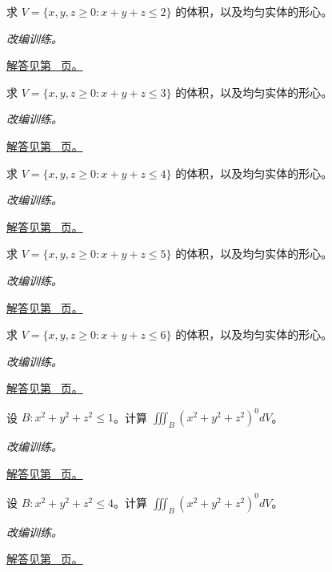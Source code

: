 \documentclass[12pt,fontset=fandol]{ctexart}
\begin{document}
\begin{example}[四面体体积与形心]\label{ex:c38q8}
求 $V=\{x,y,z\ge0:x+y+z\le 2\}$ 的体积，以及均匀实体的形心。
\par\textit{改编训练。}\par\hyperref[ans:c38q8]{解答见第~\pageref{ans:c38q8} 页。}
\end{example}
\begin{example}[四面体体积与形心]\label{ex:c38q9}
求 $V=\{x,y,z\ge0:x+y+z\le 3\}$ 的体积，以及均匀实体的形心。
\par\textit{改编训练。}\par\hyperref[ans:c38q9]{解答见第~\pageref{ans:c38q9} 页。}
\end{example}
\begin{example}[四面体体积与形心]\label{ex:c38q10}
求 $V=\{x,y,z\ge0:x+y+z\le 4\}$ 的体积，以及均匀实体的形心。
\par\textit{改编训练。}\par\hyperref[ans:c38q10]{解答见第~\pageref{ans:c38q10} 页。}
\end{example}
\begin{example}[四面体体积与形心]\label{ex:c38q11}
求 $V=\{x,y,z\ge0:x+y+z\le 5\}$ 的体积，以及均匀实体的形心。
\par\textit{改编训练。}\par\hyperref[ans:c38q11]{解答见第~\pageref{ans:c38q11} 页。}
\end{example}
\begin{example}[四面体体积与形心]\label{ex:c38q12}
求 $V=\{x,y,z\ge0:x+y+z\le 6\}$ 的体积，以及均匀实体的形心。
\par\textit{改编训练。}\par\hyperref[ans:c38q12]{解答见第~\pageref{ans:c38q12} 页。}
\end{example}
\begin{example}[球内的径向积分]\label{ex:c38q13}
设 $B:x^2+y^2+z^2\le 1$。计算 $\displaystyle\iiint_B(x^2+y^2+z^2)^{0}dV$。
\par\textit{改编训练。}\par\hyperref[ans:c38q13]{解答见第~\pageref{ans:c38q13} 页。}
\end{example}
\begin{example}[球内的径向积分]\label{ex:c38q14}
设 $B:x^2+y^2+z^2\le 4$。计算 $\displaystyle\iiint_B(x^2+y^2+z^2)^{0}dV$。
\par\textit{改编训练。}\par\hyperref[ans:c38q14]{解答见第~\pageref{ans:c38q14} 页。}
\end{example}
\end{document}
